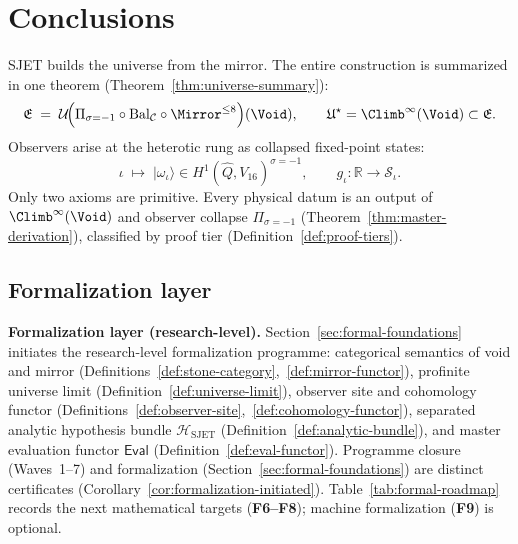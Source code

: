 \section{Conclusions}
\label{sec:conclusions}

SJET builds the universe from the mirror. The entire construction is
summarized in one theorem (Theorem~\ref{thm:universe-summary}):
\begin{equation}
  \mathfrak{E}
  \;=\;
  \mathcal{U}\!\Bigl(
    \Pi_{\sigma=-1}\circ\mathrm{Bal}_{\mathcal{C}}\circ\Mirror^{\leq 8}
  \Bigr)(\Void),
  \qquad
  \mathfrak{U}^\star=\Climb^\infty(\Void)\subset\mathfrak{E}.
\end{equation}
Observers arise at the heterotic rung as collapsed fixed-point states:
\begin{equation}
  \iota \;\longmapsto\; |\omega_\iota\rangle \in H^1(\hat Q,V_{16})^{\sigma=-1},
  \qquad
  g_\iota:\mathbb{R}\to\mathcal{S}_\iota.
\end{equation}
Only two axioms are primitive. Every physical datum is an output of
$\Climb^\infty(\Void)$ and observer collapse $\Pi_{\sigma=-1}$
(Theorem~\ref{thm:master-derivation}), classified by proof tier
(Definition~\ref{def:proof-tiers}).

\subsection{Formalization layer}

\textbf{Formalization layer (research-level).}
Section~\ref{sec:formal-foundations} initiates the research-level formalization
programme: categorical semantics of void and mirror
(Definitions~\ref{def:stone-category},~\ref{def:mirror-functor}),
profinite universe limit (Definition~\ref{def:universe-limit}),
observer site and cohomology functor
(Definitions~\ref{def:observer-site},~\ref{def:cohomology-functor}),
separated analytic hypothesis bundle $\mathcal{H}_{\mathrm{SJET}}$
(Definition~\ref{def:analytic-bundle}), and master evaluation functor
$\mathsf{Eval}$ (Definition~\ref{def:eval-functor}).
Programme closure (Waves~1--7) and formalization (Section~\ref{sec:formal-foundations})
are distinct certificates
(Corollary~\ref{cor:formalization-initiated}).
Table~\ref{tab:formal-roadmap} records the next mathematical targets
(\textbf{F6--F8}); machine formalization (\textbf{F9}) is optional.

